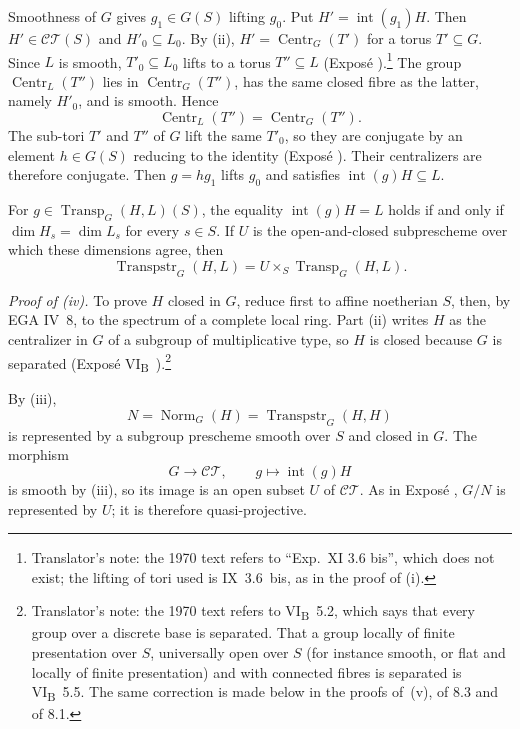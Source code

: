 Smoothness of \(G\) gives \(g_1\in G(S)\) lifting \(g_0\). Put
\(H'=\operatorname{int}(g_1)H\). Then
\(H'\in\mathcal{CT}(S)\) and \(H'_0\subseteq L_0\). By (ii),
\(H'=\operatorname{Centr}_G(T')\) for a torus \(T'\subseteq G\).
Since \(L\) is smooth, \(T'_0\subseteq L_0\) lifts to a torus
\(T''\subseteq L\) (Exposé ).\footnote{Translator's note: the
1970 text refers to ``Exp.\ XI 3.6 bis'', which does not exist; the lifting
of tori used is IX~3.6~bis, as in the proof of (i).} The group
\(\operatorname{Centr}_L(T'')\) lies in
\(\operatorname{Centr}_G(T'')\), has the same closed fibre as the
latter, namely \(H'_0\), and is smooth. Hence
\[
 \operatorname{Centr}_L(T'')
 =\operatorname{Centr}_G(T'').
\]
The sub-tori \(T'\) and \(T''\) of \(G\) lift the same \(T'_0\), so
they are conjugate by an element \(h\in G(S)\) reducing to the
identity (Exposé ). Their centralizers are therefore
conjugate. Then \(g=hg_1\) lifts \(g_0\) and satisfies
\(\operatorname{int}(g)H\subseteq L\).

For \(g\in\operatorname{Transp}_G(H,L)(S)\), the equality
\(\operatorname{int}(g)H=L\) holds if and only if
\(\dim H_s=\dim L_s\) for every \(s\in S\). If \(U\) is the
open-and-closed subprescheme over which these dimensions agree, then
\[
 \operatorname{Transpstr}_G(H,L)
 =U\times_S\operatorname{Transp}_G(H,L).
\]

\medskip\noindent\textit{Proof of (iv).}
To prove \(H\) closed in \(G\), reduce first to affine noetherian
\(S\), then, by EGA IV~8, to the spectrum of a complete local ring.
Part (ii) writes \(H\) as the centralizer in \(G\) of a subgroup of
multiplicative type, so \(H\) is closed because \(G\) is separated
(Exposé VI\textsubscript{B}~).\footnote{Translator's note: the 1970 text
refers to VI\textsubscript{B}~5.2, which says that every group over a discrete
base is separated. That a group locally of finite presentation over \(S\),
universally open over \(S\) (for instance smooth, or flat and locally of finite
presentation) and with connected fibres is separated is
VI\textsubscript{B}~5.5. The same correction is made below in the proofs
of~(v), of 8.3 and of 8.1.}

By (iii),
\[
 N=\operatorname{Norm}_G(H)
  =\operatorname{Transpstr}_G(H,H)
\]
is represented by a subgroup prescheme smooth over \(S\) and closed
in \(G\). The morphism
\[
  G\longrightarrow\mathcal{CT},
  \qquad g\longmapsto\operatorname{int}(g)H
\]
is smooth by (iii), so its image is an open subset \(U\) of
\(\mathcal{CT}\). As in Exposé , \(G/N\) is represented by
\(U\); it is therefore quasi-projective.

